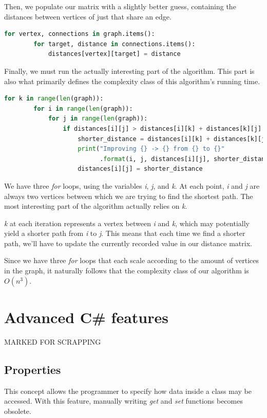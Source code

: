 \documentclass{article}
\begin{document}
Then, we populate our matrix with a slightly better guess, containing the distances between vertices of just that share an edge.

\begin{lstlisting}[language=Python]
    for vertex, connections in graph.items():
        for target, distance in connections.items():
            distances[vertex][target] = distance
\end{lstlisting}

Finally, we must run the actually interesting part of the algorithm.
This part is also what primarily defines the complexity class of this algorithm's running time.

\begin{lstlisting}[language=Python]
  for k in range(len(graph)):
        for i in range(len(graph)):
            for j in range(len(graph)):
                if distances[i][j] > distances[i][k] + distances[k][j]:
                    shorter_distance = distances[i][k] + distances[k][j]
                    print("Improving {} -> {} from {} to {}"
                          .format(i, j, distances[i][j], shorter_distance))
                    distances[i][j] = shorter_distance
\end{lstlisting}

We have three {\em for} loops, using the variables {\em i}, {\em j}, and {\em k}.
At each point, {\em i} and {\em j} are always two vertices between which we are trying to find the shortest path. The most interesting part of the algorithm actually relies on {\em k}.

{\em k} at each iteration represents a vertex between {\em i} and {\em k}, which may potentially yield a shorter path from {\em i} to {\em j}. This means that each time we find a shorter path, we'll have to update the currently recorded value in our distance matrix.

Since we have three {\em for} loops that each scale according to the amount of vertices in the graph,
it naturally follows that the complexity class of our algorithm is \(O(n^3)\).

\newpage

\section{Advanced C\# features}
\huge MARKED FOR SCRAPPING
\subsection{Properties}
This concept allows the programmer to specify how data inside a class may be accessed.
With this feature, manually writing {\em get} and {\em set} functions becomes obsolete.
\end{document}
